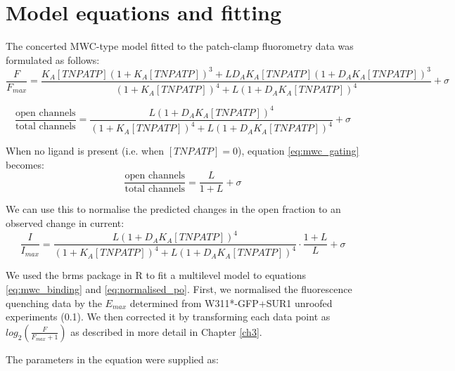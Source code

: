 \section{Model equations and fitting}

The concerted MWC-type model fitted to the patch-clamp fluorometry data was formulated as follows:
\begin{equation} \label{eq:mwc_binding}
\frac{F}{F_{max}} = \frac
    {K_A[TNPATP](1+K_A[TNPATP])^3+LD_AK_A[TNPATP](1+D_AK_A[TNPATP])^3}
    {(1+K_A[TNPATP])^4+L(1+D_AK_A[TNPATP])^4} + \sigma
\end{equation}

\begin{equation} \label{eq:mwc_gating}
\frac{\text{open channels}}{\text{total channels}} = \frac
    {L(1+D_AK_A[TNPATP])^4}
    {(1+K_A[TNPATP])^4+L(1+D_AK_A[TNPATP])^4} + \sigma
\end{equation}

When no ligand is present (i.e. when $[TNPATP] = 0$), equation \ref{eq:mwc_gating} becomes:
\begin{equation} \label{eq:intrinsic_po}
\frac{\text{open channels}}{\text{total channels}} = \frac
    {L}
    {1+L} + \sigma
\end{equation}

We can use this to normalise the predicted changes in the open fraction to an observed change in current:
\begin{equation} \label{eq:normalised_po}
\frac{I}{I_{max}} = \frac
    {L(1+D_AK_A[TNPATP])^4}
    {(1+K_A[TNPATP])^4+L(1+D_AK_A[TNPATP])^4}\cdot
   \frac
    {1+L}
    {L} + \sigma
\end{equation}

We used the brms package in R to fit a multilevel model to equations \ref{eq:mwc_binding} and \ref{eq:normalised_po}.
First, we normalised the fluorescence quenching data by the $E_{max}$ determined from W311*-GFP+SUR1 unroofed experiments (0.1).
We then corrected it by transforming each data point as $log_2(\frac{F}{F_{max} + 1})$ as described in more detail in Chapter \ref{ch3}.

The parameters in the equation were supplied as:

